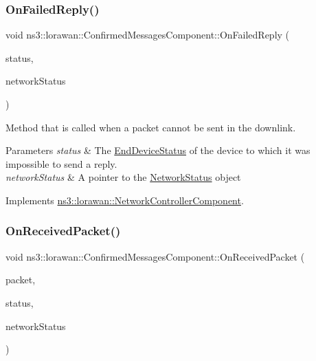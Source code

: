 \subsubsection{\texorpdfstring{On\+Failed\+Reply()}{OnFailedReply()}}
{\footnotesize\ttfamily void ns3\+::lorawan\+::\+Confirmed\+Messages\+Component\+::\+On\+Failed\+Reply (\begin{DoxyParamCaption}\item[{Ptr$<$ \hyperlink{classns3_1_1lorawan_1_1EndDeviceStatus}{End\+Device\+Status} $>$}]{status,  }\item[{Ptr$<$ \hyperlink{classns3_1_1lorawan_1_1NetworkStatus}{Network\+Status} $>$}]{network\+Status }\end{DoxyParamCaption})\hspace{0.3cm}{\ttfamily [virtual]}}

Method that is called when a packet cannot be sent in the downlink.


\begin{DoxyParams}{Parameters}
{\em status} & The \hyperlink{classns3_1_1lorawan_1_1EndDeviceStatus}{End\+Device\+Status} of the device to which it was impossible to send a reply. \\
\hline
{\em network\+Status} & A pointer to the \hyperlink{classns3_1_1lorawan_1_1NetworkStatus}{Network\+Status} object \\
\hline
\end{DoxyParams}


Implements \hyperlink{classns3_1_1lorawan_1_1NetworkControllerComponent_aaff757f6ece10a8ef24564006c137d72}{ns3\+::lorawan\+::\+Network\+Controller\+Component}.

\mbox{\label{classns3_1_1lorawan_1_1ConfirmedMessagesComponent_a0e58f518722ae87373d6a33e7523e8b1}} 
\subsubsection{\texorpdfstring{On\+Received\+Packet()}{OnReceivedPacket()}}
{\footnotesize\ttfamily void ns3\+::lorawan\+::\+Confirmed\+Messages\+Component\+::\+On\+Received\+Packet (\begin{DoxyParamCaption}\item[{Ptr$<$ const Packet $>$}]{packet,  }\item[{Ptr$<$ \hyperlink{classns3_1_1lorawan_1_1EndDeviceStatus}{End\+Device\+Status} $>$}]{status,  }\item[{Ptr$<$ \hyperlink{classns3_1_1lorawan_1_1NetworkStatus}{Network\+Status} $>$}]{network\+Status }\end{DoxyParamCaption})\hspace{0.3cm}{\ttfamily [virtual]}}

